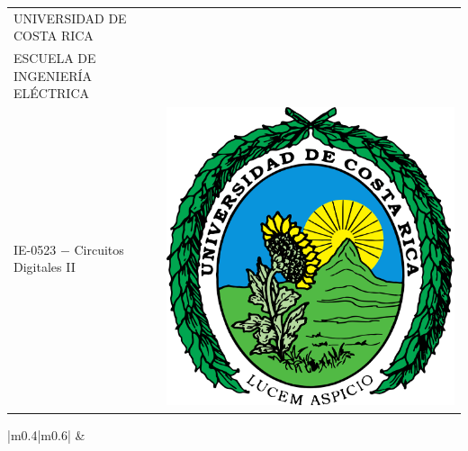 \documentclass[12pt,a4paper]{article}
\begin{document}
 

\begin{table}[H]
    \centering
    \begin{tabular} {|m{}|m{}|}

        \hline
        \centering
        \vspace{0.2cm}

        UNIVERSIDAD DE COSTA RICA \\ \vspace{0.2cm}
         ESCUELA DE INGENIERÍA ELÉCTRICA \\ \vspace{0.2cm}
         IE-0523 $-$ Circuitos Digitales II \vspace{0.2cm}
        &
        \includegraphics[width=\linewidth]{IMG/Imagen1.png}\\
        \hline
    
      \end{tabular}
    
    \begin{tabular} {|m{}|m{}|}
        &
         \\

         \hline

    \end{tabular}
\end{table}







\end{document}
